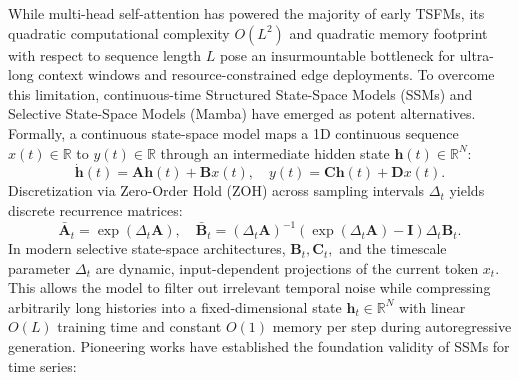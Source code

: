 While multi-head self-attention has powered the majority of early TSFMs, its quadratic computational complexity $O(L^2)$ and quadratic memory footprint with respect to sequence length $L$ pose an insurmountable bottleneck for ultra-long context windows and resource-constrained edge deployments. To overcome this limitation, continuous-time Structured State-Space Models (SSMs) and Selective State-Space Models (Mamba) have emerged as potent alternatives. Formally, a continuous state-space model maps a 1D continuous sequence $x(t) \in \mathbb{R}$ to $y(t) \in \mathbb{R}$ through an intermediate hidden state $\mathbf{h}(t) \in \mathbb{R}^N$:
\begin{equation}
    \dot{\mathbf{h}}(t) = \mathbf{A}\mathbf{h}(t) + \mathbf{B}x(t), \quad y(t) = \mathbf{C}\mathbf{h}(t) + \mathbf{D}x(t).
\end{equation}
Discretization via Zero-Order Hold (ZOH) across sampling intervals $\Delta_t$ yields discrete recurrence matrices:
\begin{equation}
    \bar{\mathbf{A}}_t = \exp(\Delta_t \mathbf{A}), \quad \bar{\mathbf{B}}_t = (\Delta_t \mathbf{A})^{-1}(\exp(\Delta_t \mathbf{A}) - \mathbf{I})\Delta_t \mathbf{B}_t.
\end{equation}
In modern selective state-space architectures, $\mathbf{B}_t, \mathbf{C}_t,$ and the timescale parameter $\Delta_t$ are dynamic, input-dependent projections of the current token $x_t$. This allows the model to filter out irrelevant temporal noise while compressing arbitrarily long histories into a fixed-dimensional state $\mathbf{h}_t \in \mathbb{R}^N$ with linear $O(L)$ training time and constant $O(1)$ memory per step during autoregressive generation. Pioneering works have established the foundation validity of SSMs for time series:
